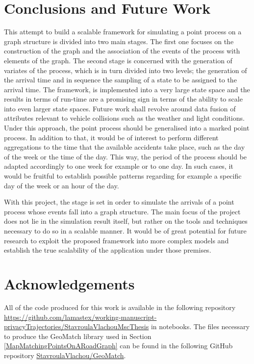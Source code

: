\documentclass[12pt]{article}
\theoremstyle{definition}
\begin{document}
\section{Conclusions and Future Work}
This attempt to build a scalable framework for simulating a point process on a graph structure is divided into two main stages. The first one focuses on the construction of the graph and the association of the events of the process with elements of the graph. The second stage is concerned with the generation of variates of the process, which is in turn divided into two levels; the generation of the arrival time and in sequence the sampling of a state to be assigned to the arrival time. The framework, is implemented into a very large state space and the results in terms of run-time are a promising sign in terms of the ability to scale into even larger state spaces. 
Future work shall revolve around data fusion of attributes relevant to vehicle collisions such as the weather and light conditions. Under this approach, the point process should be generalised into a marked point process. In addition to that, it would be of interest to perform different aggregations to the time that the available accidents take place, such as the day of the week or the time of the day. This way, the period of the process should be adapted accordingly to one week for example or to one day. In such cases, it would be fruitful to establish possible patterns regarding for example a specific day of the week or an hour of the day. 

With this project, the stage is set in order to simulate the arrivals of a point process whose events fall into a graph structure. The main focus of the project does not lie in the simulation result itself, but rather on the tools and techniques necessary to do so in a scalable manner. It would be of great potential for future research to exploit the proposed framework into more complex models and establish the true scalability of the application under those premises. 

\section{Acknowledgements}
All of the code produced for this work is available in the following repository \url{https://github.com/lamastex/working-manuscript-privacyTrajectories/StavroulaVlachouMscThesis} in notebooks. The files necessary to produce the GeoMatch library used in Section \ref{MapMatchingPointsOnARoadGraph} can be found in the following GitHub repository \href{https://github.com/StavroulaVlachou/GeoMatch}{StavroulaVlachou/GeoMatch}.
\end{document}
